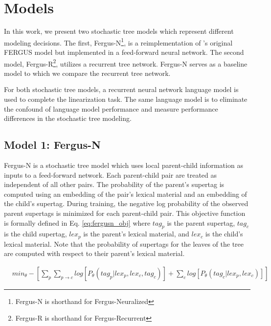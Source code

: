 \documentclass[11pt]{article}
\begin{document}
\section{Models}
\label{sec:models}

In this work, we present two stochastic tree models which represent different modeling decisions.
%
The first, Fergus-N\footnote{Fergus-N is shorthand for Fergus-Neuralized}, is a
reimplementation of 's original FERGUS model but
implemented in a feed-forward neural network.
%
The second model, Fergus-R\footnote{Fergus-R is shorthand for Fergus-Recurrent}, utilizes a recurrent tree network.
%
Fergus-N serves as a baseline model to which we compare the recurrent tree network.


For both stochastic tree models, a recurrent neural network language model is used to complete the linearization task.
%
%
The same language model is to eliminate the confound of
language model performance and measure performance differences in the
stochastic tree modeling.
%

\subsection{Model 1: Fergus-N}

Fergus-N is a stochastic tree model which uses local parent-child information as inputs to a feed-forward network.
%
Each parent-child pair are treated as independent of all other pairs.
%
The probability of the parent's supertag is computed using an embedding of the pair's lexical material and an embedding of the child's supertag.
%
During training, the negative log probability of the observed parent supertags is minimized for each parent-child pair.
%
This objective function is formally defined in Eq. \ref{eq:fergusn_obj} where $tag_p$ is the parent supertag, $tag_c$ is the child supertag, $lex_p$ is the parent's lexical material, and $lex_c$ is the child's lexical material.
%
Note that the probability of supertags for the leaves of the tree are computed
with respect to their parent's lexical material.

\begin{align}
&min_{\theta} -[\sum_p\sum_{p\to c} log[P_\theta(tag_{p} | lex_{p}, lex_{c}, tag_{c})] + \sum_c log[P_\theta(tag_{c} |lex_{p}, lex_{c})]] \label{eq:fergusn_obj}
\end{align}
\end{document}
